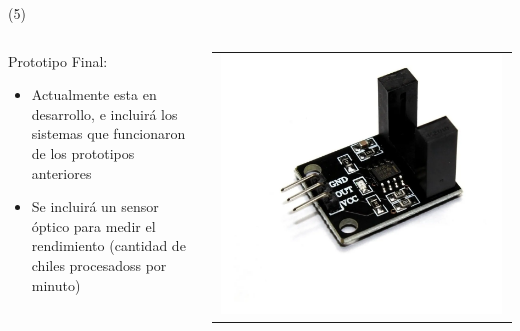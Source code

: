 \begin{frame}{ (5)}
\begin{columns}
\begin{column}{0.70\textwidth}
Prototipo Final:
\begin{itemize}
    \item Actualmente esta en desarrollo, e incluirá los sistemas que funcionaron de los prototipos anteriores
    \item Se incluirá un sensor óptico para medir el rendimiento (cantidad de chiles procesadoss por minuto)
	\end{itemize}
\end{column}
\begin{column}{0.30\textwidth}  
\begin{center}
     \begin{tabular}{c}
         \includegraphics[width=0.98\textwidth]{2022_MaquinaChilePiquin/figs/SensorOptico.png}\\
          \end{tabular}
\end{center}
\end{column} 
\end{columns} 
\end{frame}


